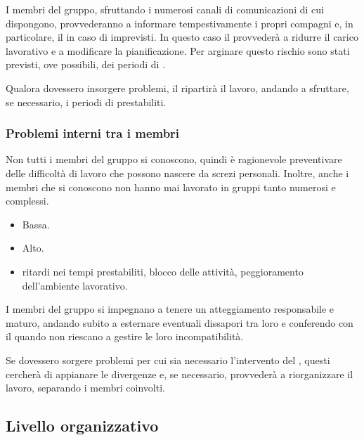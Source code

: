 \documentclass[a4paper, titlepage]{article}
\begin{document}
 I membri del gruppo, sfruttando i numerosi canali di comunicazioni di cui dispongono, provvederanno a informare tempestivamente i propri compagni e, in particolare, il  in caso di imprevisti. In questo caso il  provvederà a ridurre il carico lavorativo e a modificare la pianificazione. Per arginare questo rischio sono stati previsti, ove possibili, dei periodi di .

 Qualora dovessero insorgere problemi, il  ripartirà il lavoro, andando a sfruttare, se necessario, i periodi di  prestabiliti. 

\subsubsection{Problemi interni tra i membri}
 Non tutti i membri del gruppo si conoscono, quindi è ragionevole preventivare delle difficoltà di lavoro che possono nascere da screzi personali. Inoltre, anche i membri che si conoscono non hanno mai lavorato in gruppi tanto numerosi e complessi.
 
	\begin{itemize}
		\item {} Bassa.
		\item {} Alto.
		\item {} ritardi nei tempi prestabiliti, blocco delle attività, peggioramento dell'ambiente lavorativo.
	\end{itemize}
	
 I membri del gruppo si impegnano a tenere un atteggiamento responsabile e maturo, andando subito a esternare eventuali dissapori tra loro e conferendo con il  quando non riescano a gestire le loro incompatibilità.
 
 Se dovessero sorgere problemi per cui sia necessario l'intervento del , questi cercherà di appianare le divergenze e, se necessario, provvederà a riorganizzare il lavoro, separando i membri coinvolti.


\subsection{Livello organizzativo}
\end{document}
